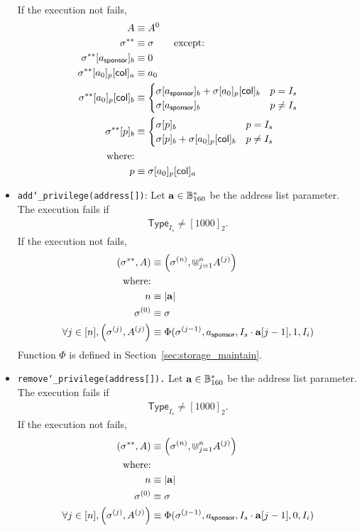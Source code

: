 \begin{itemize}
\begin{align}
	\end{align}
	If the execution not fails, 
		\begin{align}
			A & \equiv A^0 \\
			\mathbf{\sigma}^{**} &\equiv \mathbf{\sigma} \qquad \mbox{except:}\\
			\mathbf{\sigma}^{**}[a_{\sf sponsor}]_b &\equiv 0 \\ 
			\mathbf{\sigma}^{**}[a_0]_p[{\sf col}]_a &\equiv a_0\\ 
			\mathbf{\sigma}^{**}[a_0]_p[{\sf col}]_b &\equiv \begin{cases}
				\mathbf{\sigma}[a_{\sf sponsor}]_b + \mathbf{\sigma}[a_0]_p[{\sf col}]_b& p = I_s\\ 
				\mathbf{\sigma}[a_{\sf sponsor}]_b& p \neq I_s
			\end{cases}\\ 
			\mathbf{\sigma}^{**}[p]_b &\equiv \begin{cases}
				\mathbf{\sigma}[p]_b & p = I_s\\ 
				\mathbf{\sigma}[p]_b + \mathbf{\sigma}[a_0]_p[{\sf col}]_b& p \neq I_s
			\end{cases}\\
			\mbox{where:}& \\
			p & \equiv \mathbf{\sigma}[a_0]_p[{\sf col}]_a
		\end{align}
	\item {\tt add\char`_privilege(address[])}: Let $\mathbf{a}\in \mathbb{B}_{160}^*$ be the address list parameter. The execution fails if \begin{align}
		\mathsf{Type}_{I_s}\neq[1000]_2. 
	\end{align}
	If the execution not fails,
	\begin{align}
		\left(\mathbf{\sigma}^{**}, A\right) &\equiv \left(\mathbf{\sigma}^{(n)}, \Cup_{j=1}^n A^{(j)}\right)\\ 
		\mbox{where:} &\\
		n&\equiv |\mathbf{a}| \\
		\mathbf{\sigma}^{(0)} &\equiv \mathbf{\sigma} \\ 
		\forall j \in [n], \left(\mathbf{\sigma}^{(j)}, A^{(j)}\right) &\equiv \Phi(\mathbf{\sigma}^{(j-1)},a_{\sf sponsor},I_s\cdot {\bf a}[j-1],1,I_i)
	\end{align}
	Function $\Phi$ is defined in Section~\ref{sec:storage_maintain}.
	\item {\tt remove\char`_privilege(address[]).} Let $\mathbf{a}\in \mathbb{B}_{160}^*$ be the address list parameter. The execution fails if \begin{align}
		\mathsf{Type}_{I_s}\neq[1000]_2. 
	\end{align}
	If the execution not fails, 
	\begin{align}
		\left(\mathbf{\sigma}^{**}, A\right) &\equiv \left(\mathbf{\sigma}^{(n)}, \Cup_{j=1}^n A^{(j)}\right)\\ 
		\mbox{where:} &\\
		n&\equiv |\mathbf{a}| \\
		\mathbf{\sigma}^{(0)} &\equiv \mathbf{\sigma} \\ 
		\forall j \in [n], \left(\mathbf{\sigma}^{(j)}, A^{(j)}\right) &\equiv \Phi(\mathbf{\sigma}^{(j-1)},a_{\sf sponsor},I_s\cdot {\bf a}[j-1],0,I_i)
	\end{align}
\end{itemize}

